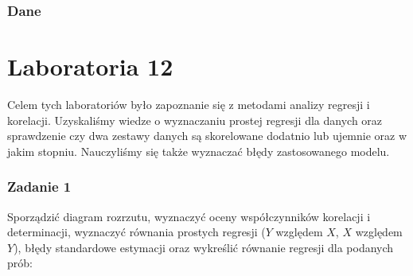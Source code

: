 \documentclass{article}
\begin{document}
\newpage
\section{Dane}

\begin{center}
\tiny
{}
\end{center}

\newpage
\begin{center}
\tiny
{}
\end{center}

\newpage
\part{Laboratoria 12}
Celem tych laboratoriów było zapoznanie się z metodami analizy regresji i korelacji. Uzyskaliśmy wiedze o wyznaczaniu prostej regresji dla danych oraz sprawdzenie czy dwa zestawy danych są skorelowane dodatnio lub ujemnie oraz w jakim stopniu. Nauczyliśmy się także wyznaczać błędy zastosowanego modelu.

\section{Zadanie 1}

Sporządzić diagram rozrzutu, wyznaczyć oceny współczynników korelacji i determinacji, wyznaczyć równania prostych regresji ($Y$ względem $X$, $X$ względem $Y$), błędy standardowe estymacji oraz wykreślić równanie regresji dla podanych prób:
\end{document}
